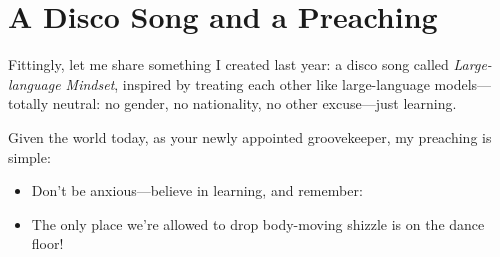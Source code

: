 \documentclass{article}
\begin{document}
\section*{A Disco Song and a Preaching}

Fittingly, let me share something I created last year: a disco song called \textit{Large-language Mindset}, inspired by treating each other like large-language models—totally neutral: no gender, no nationality, no other excuse—just learning.

Given the world today, as your newly appointed groovekeeper, my preaching is simple:
\begin{itemize}
    \item Don’t be anxious—believe in learning, and remember:
    \item The only place we’re allowed to drop body-moving shizzle is on the dance floor!
\end{itemize}
\end{document}
